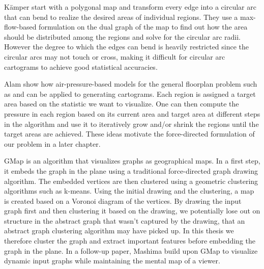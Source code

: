 Kämper \etal{} \cite{cartograms-circulararcs} start with a polygonal map and transform every edge into a circular arc that can bend to realize the desired areas of individual regions. They use a max-flow-based formulation on the dual graph of the map to find out how the area should be distributed among the regions and solve for the circular arc radii. However the degree to which the edges can bend is heavily restricted since the circular arcs may not touch or cross, making it difficult for circular arc cartograms to achieve good statistical accuracies.

Alam \etal{} \cite{cartograms-optimal-complexity} show how air-pressure-based models for the general floorplan problem such as \cite{cartograms-airpressure} and \cite{cartograms-airpressure2} can be applied to generating cartograms. Each region is assigned a target area based on the statistic we want to visualize. One can then compute the pressure in each region based on its current area and target area at different steps in the algorithm and use it to iteratively grow and/or shrink the regions until the target areas are achieved. These ideas motivate the force-directed formulation of our problem in a later chapter.

GMap \cite{gmap} is an algorithm that visualizes graphs as geographical maps. In a first step, it embeds the graph in the plane using a traditional force-directed graph drawing algorithm. The embedded vertices are then clustered using a geometric clustering algorithms such as k-means. Using the initial drawing and the clustering, a map is created based on a Voronoi diagram of the vertices. By drawing the input graph first and then clustering it based on the drawing, we potentially lose out on structure in the abstract graph that wasn't captured by the drawing, that an abstract graph clustering algorithm may have picked up. In this thesis we therefore cluster the graph and extract important features before embedding the graph in the plane. In a follow-up paper, Mashima \etal{} \cite{dynamicmaps} build upon GMap to visualize dynamic input graphs while maintaining the mental map of a viewer.


